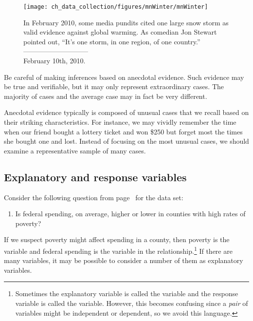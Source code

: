 \setlength{\captionwidth}{\textwidth-80mm}
\begin{figure}
\centering
\hspace{8mm}\texttt{[image: ch\_data\_collection/figures/mnWinter/mnWinter]}\hspace{4mm}
\begin{minipage}[b]{\textwidth - 80mm}
   \caption[anecdotal evidence]{In February 2010, some media pundits cited one large snow storm as valid evidence against global warming. As comedian Jon Stewart pointed out, ``It's one storm, in one region, of one country.''\vspace{-4.5mm} \\

   -----------------------------\vspace{-2mm}\\
   {\footnotesize February 10th, 2010.}
   \label{mnWinter}}
\end{minipage}
\end{figure}
\setlength{\captionwidth}{\mycaptionwidth}

\begin{termBox}{
Be careful of making inferences based on anecdotal evidence. Such evidence may be true and verifiable, but it may only represent extraordinary cases. The majority of cases and the average case may in fact be very different.}
\end{termBox}

Anecdotal evidence typically is composed of unusual cases that we recall based on their striking characteristics. For instance, we may vividly remember the time when our friend bought a lottery ticket and won \$250 but forget most the times she bought one and lost. Instead of focusing on the most unusual cases, we should examine a representative sample of many cases.


\textA{\pagebreak}

\subsection{Explanatory and response variables}
\label{explanatoryAndResponse}


Consider the following question from page~\pageref{fedSpendingPovertyQuestion} for the  data set:
\begin{enumerate}
\item[(1)]
	Is federal spending, on average, higher or lower in counties with high rates of poverty?
\end{enumerate}
If we suspect poverty might affect spending in a county, then poverty is the  variable and federal spending is the  variable in the relationship.\footnote{Sometimes the explanatory variable is called the  variable and the response variable is called the  variable. However, this becomes confusing since a \emph{pair} of variables might be independent or dependent, so we avoid this language.} If there are many variables, it may be possible to consider a number of them as explanatory variables.

